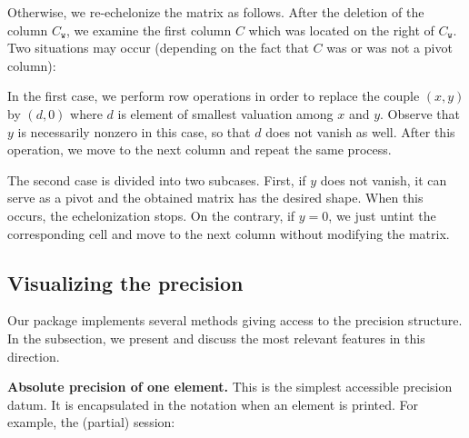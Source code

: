 \documentclass[sigconf]{acmart}
\newcommand{\ph}{\vphantom{$A^A_A$}}
\newcommand{\ttw}{\texttt{w}\xspace}
\theoremstyle{definition}
\begin{document}
Otherwise, we re-echelonize the matrix as follows. After the deletion 
of the column $C_\ttw$, we examine the first column $C$ which was 
located on the right of $C_\ttw$. Two situations may occur (depending
on the fact that $C$ was or was not a pivot column):

\noindent \hfill
{}
\hfill\null

\noindent

In the first case, we perform row operations in order to replace the 
couple $(x,y)$ by $(d, 0)$ where $d$ is element of smallest valuation 
among $x$ and $y$. Observe that $y$ is necessarily nonzero in this case, 
so that $d$ does not vanish as well. After this operation, we move to
the next column and repeat the same process.

The second case is divided into two subcases. First, if $y$ does not 
vanish, it can serve as a pivot and the obtained matrix has the desired 
shape. When this occurs, the echelonization stops. On the contrary, if 
$y = 0$, we just untint the corresponding cell and move to the next 
column without modifying the matrix.

\subsection{Visualizing the precision}

Our package implements several methods giving access to the precision 
structure. In the subsection, we present and discuss the most relevant 
features in this direction.

\medskip

\noindent \textbf{Absolute precision of one element.}
%
This is the simplest accessible precision datum.
It is encapsulated in the notation when an element is printed. For
example, the (partial) session:
\end{document}

